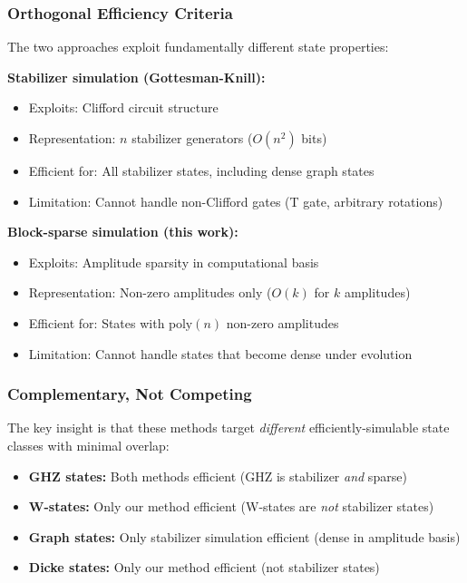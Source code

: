 \documentclass[11pt,twocolumn]{article}
\begin{document}
\subsubsection{Orthogonal Efficiency Criteria}

The two approaches exploit fundamentally different state properties:

\textbf{Stabilizer simulation (Gottesman-Knill):}
\begin{itemize}
    \item Exploits: Clifford circuit structure
    \item Representation: $n$ stabilizer generators ($O(n^2)$ bits)
    \item Efficient for: All stabilizer states, including dense graph states
    \item Limitation: Cannot handle non-Clifford gates (T gate, arbitrary rotations)
\end{itemize}

\textbf{Block-sparse simulation (this work):}
\begin{itemize}
    \item Exploits: Amplitude sparsity in computational basis
    \item Representation: Non-zero amplitudes only ($O(k)$ for $k$ amplitudes)
    \item Efficient for: States with $\text{poly}(n)$ non-zero amplitudes
    \item Limitation: Cannot handle states that become dense under evolution
\end{itemize}

\subsubsection{Complementary, Not Competing}

The key insight is that these methods target \emph{different} efficiently-simulable state classes with minimal overlap:

\begin{itemize}
    \item \textbf{GHZ states:} Both methods efficient (GHZ is stabilizer \emph{and} sparse)
    \item \textbf{W-states:} Only our method efficient (W-states are \emph{not} stabilizer states)
    \item \textbf{Graph states:} Only stabilizer simulation efficient (dense in amplitude basis)
    \item \textbf{Dicke states:} Only our method efficient (not stabilizer states)
\end{itemize}
\end{document}
